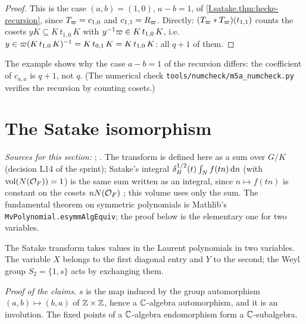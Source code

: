 \begin{example}
\end{example}
\begin{proof}
This is the case $(a,b)=(1,0)$, $a-b=1$, of \cref{I.satake.thm:hecke-recursion}, since $T_\varpi=c_{1,0}$ and
$c_{1,1}=R_\varpi$. Directly: $(T_\varpi*T_\varpi)(t_{1,1})$ counts the cosets $yK\subseteq K\,t_{1,0}\,K$ with
$y^{-1}\varpi\in K\,t_{1,0}\,K$, i.e.\ $y\in\varpi(K\,t_{1,0}\,K)^{-1}=K\,t_{0,1}\,K=K\,t_{1,0}\,K$: all $q+1$ of them.
\end{proof}

\noindent The example shows why the case $a-b=1$ of the recursion differs: the coefficient of $c_{a,a}$ is $q+1$,
not $q$. (The numerical check \texttt{tools/numcheck/m5a\_numcheck.py} verifies the recursion by counting cosets.)

\section{The Satake isomorphism}\label{sec:satake-iso}

{\sloppy\noindent\emph{Sources for this section:} \cite[Ch.~II, §§5.1--6.2, pp.~23--30 (the transform (6.1)--(6.3) and
Theorem~3, p.~29); §8.3, Theorem~6\,(i), p.~45]{Sat}; \cite[§9, Proposition~37, p.~52]{BumpH}. The transform is defined
here as a sum over $G/K$ (decision L14 of the sprint); Satake's integral $\delta_B^{1/2}(t)\int_Nf(tn)\,\mathrm{d} n$ (with $\operatorname{vol}(N(\mathcal{O}_F))=1$) is the same
sum written as an integral, since $n\mapsto f(tn)$ is constant on the cosets $nN(\mathcal{O}_F)$ \cite[(6.2), p.~27]{Sat}; this volume uses only
the sum. The fundamental theorem on symmetric polynomials is Mathlib's
\texttt{MvPolynomial.esymmAlgEquiv}; the proof below is the elementary one for two variables.\par}

The Satake transform takes values in the Laurent polynomials in two variables. The variable $X$ belongs to the
first diagonal entry and $Y$ to the second; the Weyl group $S_2=\{1,s\}$ acts by exchanging them.

\begin{definition}
\end{definition}

\noindent\emph{Proof of the claims.} $s$ is the map induced by the group automorphism $(a,b)\mapsto(b,a)$ of
$\mathbb{Z}\times\mathbb{Z}$, hence a $\mathbb{C}$-algebra automorphism, and it is an involution. The fixed points of a $\mathbb{C}$-algebra
endomorphism form a $\mathbb{C}$-subalgebra.

